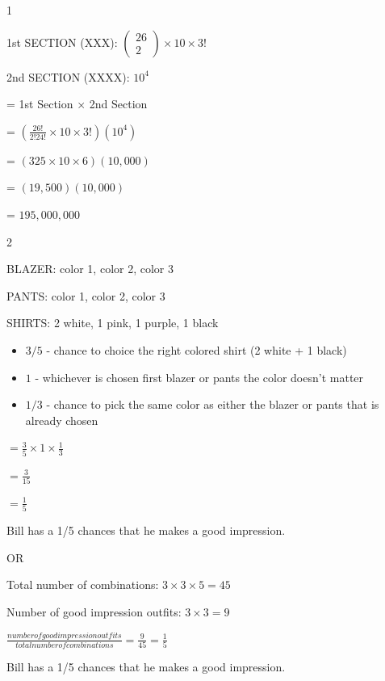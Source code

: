 \documentclass[12 pt]{article}
\begin{document}
    \begin{exercise}{1}
        \hfill
        
        1st SECTION (XXX): $\begin{pmatrix}
            26 \\
            2
        \end{pmatrix} \times 10 \times 3!$ 

        2nd SECTION (XXXX): $10^{4}$ 

        = 1st Section $\times$ 2nd Section
        
        = $(\frac{26!}{2!24!} \times 10 \times 3!)(10^{4})$
        
        = $(325 \times 10 \times 6)(10,000)$

        = $(19,500)(10,000)$

        = $195,000,000$
    \end{exercise}

    \begin{exercise}{2}
    \hfill

    BLAZER: color 1, color 2, color 3
    
    PANTS: color 1, color 2, color 3
    
    SHIRTS: 2 white, 1 pink, 1 purple, 1 black
    
    \begin{itemize}
        \item $3/5$ - chance to choice the right colored shirt (2 white + 1 black)
        \item $1$ - whichever is chosen first blazer or pants the color doesn't matter
        \item $1/3$ - chance to pick the same color as either the blazer or pants that is already chosen
    \end{itemize}

    $ = \frac{3}{5} \times 1 \times \frac{1}{3}$

    $ = \frac{3}{15}$
    
    $= \frac{1}{5}$
    
    Bill has a 1/5 chances that he makes a good impression.

    OR

    Total number of combinations: $3 \times 3 \times 5 = 45$

    Number of good impression outfits: $3 \times 3 = 9$

    $\frac{number of good impression outfits}{total number of combinations} = \frac{9}{45} = \frac{1}{5}$

    Bill has a 1/5 chances that he makes a good impression.
    \end{exercise}
\end{document}
